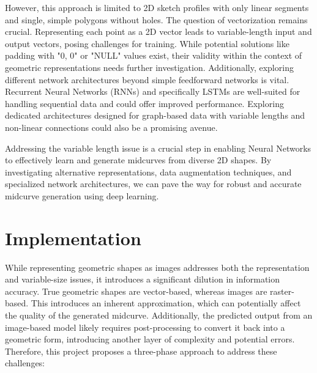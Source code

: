 \documentclass[conference]{IEEEtran}
\begin{document}
However, this approach is limited to 2D sketch profiles with only linear segments and single, simple polygons without holes. The question of vectorization remains crucial. Representing each point as a 2D vector leads to variable-length input and output vectors, posing challenges for training. While potential solutions like padding with "0, 0" or "NULL" values exist, their validity within the context of geometric representations needs further investigation.
Additionally, exploring different network architectures beyond simple feedforward networks is vital. Recurrent Neural Networks (RNNs) and specifically LSTMs are well-suited for handling sequential data and could offer improved performance. Exploring dedicated architectures designed for graph-based data with variable lengths and non-linear connections could also be a promising avenue.

Addressing the variable length issue is a crucial step in enabling Neural Networks to effectively learn and generate midcurves from diverse 2D shapes. By investigating alternative representations, data augmentation techniques, and specialized network architectures, we can pave the way for robust and accurate midcurve generation using deep learning.


\section{Implementation}
\label{sec:4}

While representing geometric shapes as images addresses both the representation and variable-size issues, it introduces a significant dilution in information accuracy. True geometric shapes are vector-based, whereas images are raster-based. This introduces an inherent approximation, which can potentially affect the quality of the generated midcurve. Additionally, the predicted output from an image-based model likely requires post-processing to convert it back into a geometric form, introducing another layer of complexity and potential errors.
Therefore, this project proposes a three-phase approach to address these challenges:
\end{document}
